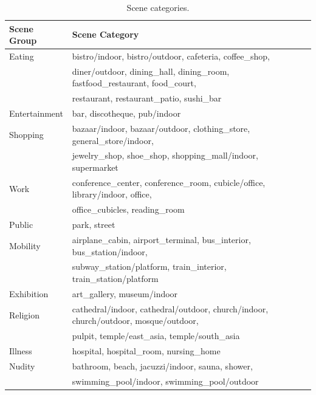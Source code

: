 \begin{table}[tb]
\centering
\caption{Scene categories.}
\label{tbl-scenecate}
\begin{tabular}{ll}
\toprule
Scene Group    & Scene Category                                       \\ \midrule
Eating         & bistro/indoor, bistro/outdoor, cafeteria, coffee\_shop, \\
               & diner/outdoor, dining\_hall, dining\_room, fastfood\_restaurant, food\_court, \\
               & restaurant, restaurant\_patio, sushi\_bar            \\ \midrule
Entertainment  & bar, discotheque, pub/indoor                         \\ \midrule
Shopping       & bazaar/indoor, bazaar/outdoor, clothing\_store, general\_store/indoor, \\
               & jewelry\_shop, shoe\_shop, shopping\_mall/indoor, supermarket  \\ \midrule
Work           & conference\_center, conference\_room, cubicle/office, library/indoor, office, \\
               & office\_cubicles, reading\_room                      \\ \midrule
Public         & park, street                                         \\ \midrule
Mobility       & airplane\_cabin, airport\_terminal, bus\_interior, bus\_station/indoor, \\
               & subway\_station/platform, train\_interior, train\_station/platform \\ \midrule
Exhibition     & art\_gallery, museum/indoor                          \\ \midrule
Religion       & cathedral/indoor, cathedral/outdoor, church/indoor, church/outdoor, mosque/outdoor, \\
               & pulpit, temple/east\_asia, temple/south\_asia        \\ \midrule
Illness        & hospital, hospital\_room, nursing\_home                \\ \midrule
Nudity         & bathroom, beach, jacuzzi/indoor, sauna, shower, \\
               & swimming\_pool/indoor, swimming\_pool/outdoor        \\ \bottomrule
\end{tabular}
\end{table}




